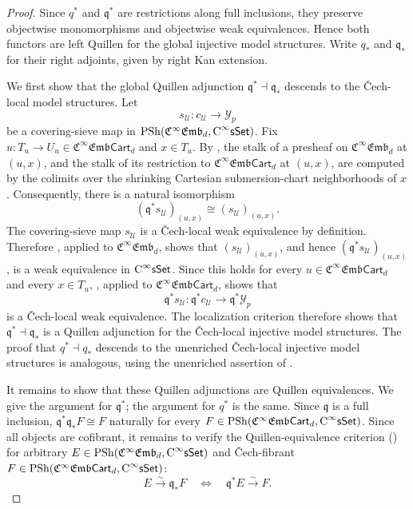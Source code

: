 \documentclass{amsart}
\newcommand{\cat}[1]{\mathsf{#1}}
\newcommand{\sset}{\cat{sSet}}
\newcommand{\CsSet}{\textnormal{C}^{\infty}\sset}
\newcommand{\femb}[1]{\mathfrak{C}^{\infty}\mathfrak{Emb}_{#1}}
\newcommand{\fembcart}[1]{\mathfrak{C}^{\infty}\mathfrak{Emb}\cat{Cart}_{#1}}
\newcommand{\psh}{\mathrm{PSh}}
\newcommand{\Yo}{\mathscr{Y}}
\theoremstyle{definition}
\numberwithin{equation}{subsection}
\numberwithin{subsubsection}{subsection}
\begin{document}
\begin{proof}
  Since \(q^{*}\) and \(\mathfrak{q}^{*}\) are restrictions along full
  inclusions, they preserve objectwise monomorphisms and objectwise weak
  equivalences. Hence both functors are left Quillen for the global
  injective model structures. Write \(q_{*}\) and \(\mathfrak{q}_{*}\) for their
  right
  adjoints, given by right Kan extension.

  We first show that the global Quillen adjunction
  \(\mathfrak{q}^*\dashv\mathfrak{q}_*\) descends to the \v{C}ech-local model
  structures. Let
  \[
    s_{\mathcal{U}}:c_{\mathcal{U}}\longrightarrow\Yo_p
  \]
  be a covering-sieve map in \(\psh(\femb{d},\CsSet)\). Fix
  \(u:T_u\to U_u\in\fembcart{d}\) and \(x\in T_u\). By
  , the stalk of a
  presheaf on \(\femb{d}\) at \((u,x)\), and the stalk of its restriction to
  \(\fembcart{d}\) at \((u,x)\), are computed by the colimits over the
  shrinking Cartesian submersion-chart neighborhoods of \(x\). Consequently,
  there is a natural isomorphism
  \[
    (\mathfrak{q}^*s_{\mathcal{U}})_{(u,x)}
    \cong
    (s_{\mathcal{U}})_{(u,x)}.
  \]
  The covering-sieve map \(s_{\mathcal{U}}\) is a \v{C}ech-local weak
  equivalence by definition. Therefore
  , applied to
  \(\femb{d}\), shows that \((s_{\mathcal{U}})_{(u,x)}\), and hence
  \((\mathfrak{q}^*s_{\mathcal{U}})_{(u,x)}\), is a weak equivalence in
  \(\CsSet\). Since this holds for every \(u\in\fembcart{d}\) and every
  \(x\in T_u\), , applied to
  \(\fembcart{d}\), shows that
  \[
    \mathfrak{q}^*s_{\mathcal{U}}:
    \mathfrak{q}^*c_{\mathcal{U}}\longrightarrow\mathfrak{q}^*\Yo_p
  \]
  is a \v{C}ech-local weak equivalence. The localization criterion therefore
  shows that \(\mathfrak{q}^*\dashv\mathfrak{q}_*\) is a Quillen adjunction for
  the \v{C}ech-local injective model structures. The proof that
  \(q^*\dashv q_*\) descends to the unenriched \v{C}ech-local injective model
  structures is analogous, using the unenriched assertion of
  .

  It remains to show that these Quillen adjunctions are Quillen
  equivalences. We give the argument for \(\mathfrak{q}^{*}\); the argument
  for \(q^{*}\) is the same. Since \(\mathfrak{q}\) is a full inclusion,
  \(\mathfrak{q}^{*}\mathfrak{q}_{*}F\cong F\) naturally for every
  \(F\in\psh(\fembcart{d},\CsSet)\). Since all objects are cofibrant, it
  remains to verify the Quillen-equivalence criterion
  () for arbitrary
  \(E\in\psh(\femb{d},\CsSet)\) and \v{C}ech-fibrant
  \(F\in\psh(\fembcart{d},\CsSet)\):
  \[
    E\xrightarrow{\sim}\mathfrak{q}_{*}F
    \quad\Longleftrightarrow\quad
    \mathfrak{q}^{*}E\xrightarrow{\sim}F.
  \]


\end{proof}
\end{document}
